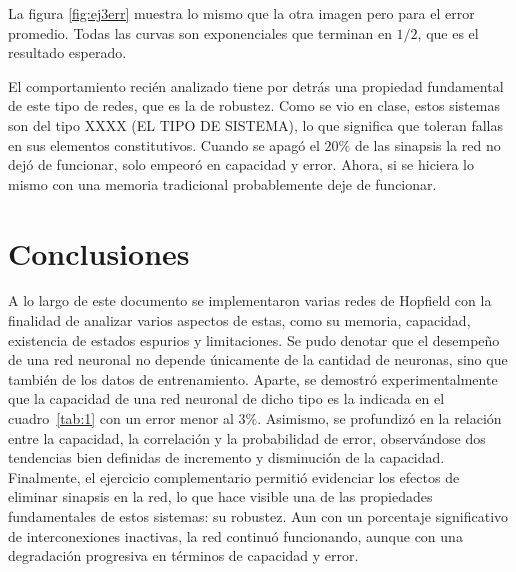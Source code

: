 \documentclass[11pt]{article} %
\begin{document}
La figura \ref{fig:ej3err} muestra lo mismo que la otra imagen pero para el error promedio. Todas las curvas son exponenciales que terminan en $1/2$, que es el resultado esperado.

El comportamiento recién analizado tiene por detrás una propiedad fundamental de este tipo de redes, que es la de robustez. Como se vio en clase, estos sistemas son del tipo XXXX (EL TIPO DE SISTEMA), lo que significa que toleran fallas en sus elementos constitutivos. Cuando se apagó el $20\%$ de las sinapsis la red no dejó de funcionar, solo empeoró en capacidad y error. Ahora, si se hiciera lo mismo con una memoria tradicional probablemente deje de funcionar.


\section{Conclusiones}

A lo largo de este documento se implementaron varias redes de Hopfield con la finalidad de analizar varios aspectos de estas, como su memoria, capacidad, existencia de estados espurios y limitaciones. Se pudo denotar que el desempeño de una red neuronal no depende únicamente de la cantidad de neuronas, sino que también de los datos de entrenamiento. Aparte, se demostró experimentalmente que la capacidad de una red neuronal de dicho tipo es la indicada en el cuadro~\ref{tab:1} con un error menor al $3\%$. Asimismo, se profundizó en la relación entre la capacidad, la correlación y la probabilidad de error, observándose dos tendencias bien definidas de incremento y disminución de la capacidad.
Finalmente, el ejercicio complementario permitió evidenciar los efectos de eliminar sinapsis en la red, lo que hace visible una de las propiedades fundamentales de estos sistemas: su robustez. Aun con un porcentaje significativo de interconexiones inactivas, la red continuó funcionando, aunque con una degradación progresiva en términos de capacidad y error.
\end{document}
